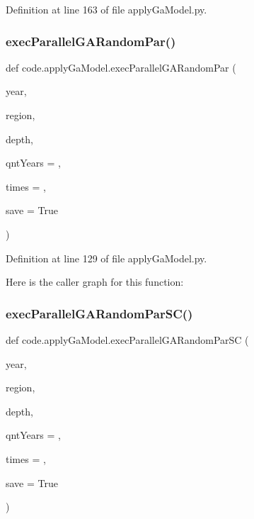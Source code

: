 Definition at line 163 of file apply\+Ga\+Model.\+py.

\mbox{\label{namespacecode_1_1apply_ga_model_abf58483d7e74e0d52aec7d2900fc2613}} 
\subsubsection{\texorpdfstring{exec\+Parallel\+G\+A\+Random\+Par()}{execParallelGARandomPar()}}
{\footnotesize\ttfamily def code.\+apply\+Ga\+Model.\+exec\+Parallel\+G\+A\+Random\+Par (\begin{DoxyParamCaption}\item[{}]{year,  }\item[{}]{region,  }\item[{}]{depth,  }\item[{}]{qnt\+Years = {},  }\item[{}]{times = {},  }\item[{}]{save = {\ttfamily True} }\end{DoxyParamCaption})}



Definition at line 129 of file apply\+Ga\+Model.\+py.

Here is the caller graph for this function\+:
\mbox{\label{namespacecode_1_1apply_ga_model_a38183cdd99189106a38c3781c3157055}} 
\subsubsection{\texorpdfstring{exec\+Parallel\+G\+A\+Random\+Par\+S\+C()}{execParallelGARandomParSC()}}
{\footnotesize\ttfamily def code.\+apply\+Ga\+Model.\+exec\+Parallel\+G\+A\+Random\+Par\+SC (\begin{DoxyParamCaption}\item[{}]{year,  }\item[{}]{region,  }\item[{}]{depth,  }\item[{}]{qnt\+Years = {},  }\item[{}]{times = {},  }\item[{}]{save = {\ttfamily True} }\end{DoxyParamCaption})}



